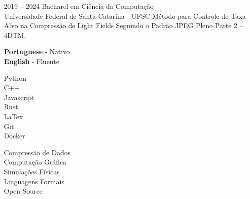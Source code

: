 \documentclass[11pt]{developercv} %
\begin{document}


\begin{entrylist}
	\entry
		{2019 -- 2024}
		{Bacharel em Ciência da Computação}
		{\\Universidade Federal de Santa Catarina - UFSC}
		{
			Método para Controle de Taxa Alvo na Compressão de Light Fields Seguindo o Padrão JPEG Pleno Parte 2 – 4DTM.
		}
\end{entrylist}


\begin{minipage}[t]{0.3\textwidth}
	\vspace{-\baselineskip} %
 
	\textbf{Portuguese} - Nativo \\
	\textbf{English} - Fluente
\end{minipage}
\hfill
\begin{minipage}[t]{0.3\textwidth}
	\vspace{-\baselineskip} %
 
    Python\\
    C++\\
    Javascript\\
	Rust\\
    LaTex\\
    Git\\
    Docker\\
    
    
\end{minipage}
\hfill
\begin{minipage}[t]{0.3\textwidth}
	\vspace{-\baselineskip} %
 
    Compressão de Dados\\
    Computação Gráfica\\
    Simulações Físicas\\
	Linguagens Formais\\
    Open Source
\end{minipage}

\end{document}
